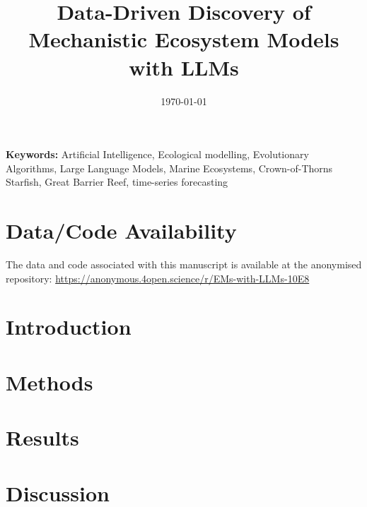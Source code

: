\documentclass[12pt,a4paper]{article}
\title{Data-Driven Discovery of Mechanistic Ecosystem Models with LLMs}
\date{\today}
\newcommand{\keywords}{%
Artificial Intelligence,
Ecological modelling,
Evolutionary Algorithms,
Large Language Models,
Marine Ecosystems,
Crown-of-Thorns Starfish,
Great Barrier Reef,
time-series forecasting%
}
\begin{document}
\maketitle
\vspace{1em}

\noindent\textbf{Keywords:} \keywords
\vspace{2em}
\newpage


\section*{Data/Code Availability}
The data and code associated with this manuscript is available at the anonymised repository: \url{https://anonymous.4open.science/r/EMs-with-LLMs-10E8}

\newpage
\section{Introduction}

\section{Methods}

\section{Results}

\section{Discussion}





\end{document}
